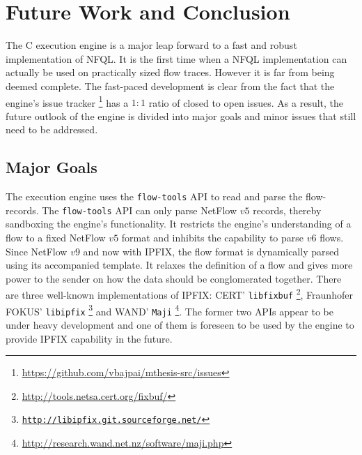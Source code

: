 \chapter{Future Work and Conclusion}\label{ch:future-work}

The C execution engine is a major leap forward to a fast and robust
implementation of \ac{NFQL}. It is the first time when a \ac{NFQL}
implementation can actually be used on practically sized flow traces. However
it is far from being deemed complete. The fast-paced development is clear from
the fact that the engine's issue tracker
\footnote{\url{https://github.com/vbajpai/mthesis-src/issues}} has a $1:1$
ratio of closed to open issues. As a result, the future outlook of the engine
is divided into major goals and minor issues that still need to be addressed.

\section{Major Goals}\label{sec:major-goals}

The execution engine uses the \texttt{flow-tools} \ac{API} to read and parse
the flow-records. The \texttt{flow-tools} \ac{API} can only parse NetFlow $v5$
records, thereby sandboxing the engine's functionality. It restricts the
engine's understanding of a flow to a fixed NetFlow $v5$ format and inhibits
the capability to parse $v6$ flows. Since NetFlow $v9$ and now with
\ac{IPFIX}, the flow format  is dynamically parsed
using its accompanied template. It relaxes the definition of a flow and gives
more power to the sender on how the data should be conglomerated together.
There are three well-known implementations of \ac{IPFIX}: CERT'
\texttt{libfixbuf} \footnote{\url{http://tools.netsa.cert.org/fixbuf/}},
Fraunhofer FOKUS' \texttt{libipfix}
\footnote{\href{http://libipfix.git.sourceforge.net/git/gitweb.cgi?p=libipfix/libipfix;a=summary}{\texttt{http://libipfix.git.sourceforge.net/}}}
and WAND' \texttt{Maji}
\footnote{\url{http://research.wand.net.nz/software/maji.php}}. The former two
\ac{API}s appear to be under heavy development and one of them is foreseen to
be used by the engine to provide \ac{IPFIX} capability in the future.




